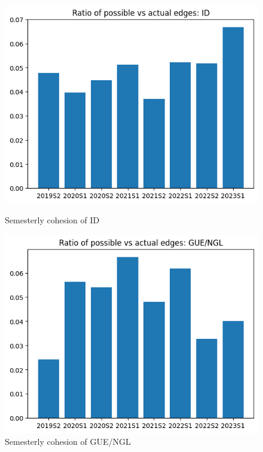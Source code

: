 \documentclass[lettersize,journal]{IEEEtran}
\begin{document}
\begin{figure}[h]
	\centering
	\begin{minipage}[b]{0.23\textwidth}
		\includegraphics[width=\textwidth]{coh_id.png}
		\caption{Semesterly cohesion of ID}
		\label{fig:coh_id}
	\end{minipage}
	\hfill
	\begin{minipage}[b]{0.23\textwidth}
		\includegraphics[width=\textwidth]{coh_guengl.png}
		\caption{Semesterly cohesion of GUE/NGL}
		\label{fig:coh_guengl}
	\end{minipage}
\end{figure}
\end{document}
